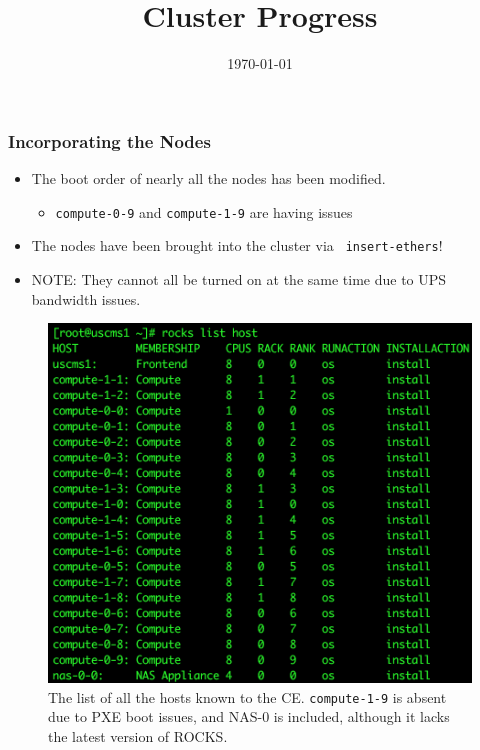 \documentclass{beamer}
\title{Cluster Progress}
\date{\today}
\begin{document}

\begin{frame}
  \maketitle
\end{frame}



\begin{frame}

  \frametitle{Incorporating the Nodes}
  
  \begin{multicols}{2}

    \begin{itemize}
    \item The boot order of nearly all the nodes has been modified.
      \begin{itemize}
      \item {\tt compute-0-9} and {\tt compute-1-9} are having issues
      \end{itemize}
    \item The nodes have been brought into the cluster via {\tt
        insert-ethers}!
    \item NOTE: They cannot all be turned on at the same time due to UPS
      bandwidth issues.
    \end{itemize}
    
    \columnbreak
    
    \begin{figure}[H]
      \begin{center}
        \includegraphics[scale=0.35]{CEHostList.png}
      \end{center}
      \caption{The list of all the hosts known to the CE. {\tt compute-1-9} is
        absent due to PXE boot issues, and NAS-0 is included, although it lacks
        the latest version of ROCKS.}
    \end{figure}
  

\end{multicols}
\end{frame}
\end{document}
